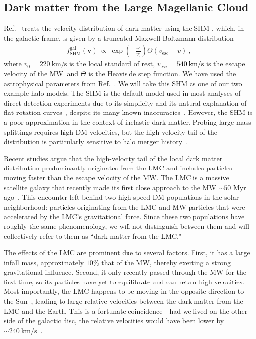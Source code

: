 \documentclass[aps,prd,amsmath,amssymb,10pt,letterpaper,balancelastpage,showpacs,superscriptaddress,nofootinbib,floatfix,notitlepage,longbibliography,twocolumn
]{revtex4-2}
\newcommand{\numcolor}[1]{\textcolor{black}{#1}}
\newcommand{\vbold}{\mathbf{v}}
\newcommand{\vesc}{v_{\text{esc}}}
\newcommand{\kms}{\text{km}/\text{s}}
\begin{document}
\subsection{Dark matter from the Large Magellanic Cloud\label{sec:DM LMC}}
Ref.~\cite{Luminous} treats the velocity distribution of dark matter using the SHM \cite{Original_SHM}, which, in the galactic frame, is given by a truncated Maxwell-Boltzmann distribution
\begin{align}
    f^{\text{gal}}_{\text{SHM}}(\vbold) ~ \propto ~ \exp\left(-\frac{v^2}{v_0^2}\right) \Theta(\vesc - v) ~,
\end{align}
where $v_0=220 ~\kms$ is the local standard of rest, \numcolor{$\vesc=540~\kms$} is the escape velocity of the MW, and $\Theta$ is the Heaviside step function. We have used the astrophysical parameters from Ref.~\cite{LMC}. We will take this SHM as one of our two example halo models. The SHM is the default model used in most analyses of direct detection experiments due to its simplicity and its natural explanation of flat rotation curves~\cite{Lisanti_TASI, SHM++}, despite its many known inaccuracies~\cite{SMH_Deviation_1, SMH_Deviation_2, SMH_Deviation_3, SMH_Deviation_4, SMH_Deviation_5}. However, the SHM is a poor approximation in the context of inelastic dark matter. Probing large mass splittings requires high DM velocities, but the high-velocity tail of the distribution is particularly sensitive to halo merger history~\cite{Lisanti_TASI, SMH_Deviation_4}. 

Recent studies \cite{LMCHighSpeed, LMC, LMC_Similar} argue that the high-velocity tail of the local dark matter distribution predominantly originates from the LMC and includes particles moving faster than the escape velocity of the MW. The LMC is a massive satellite galaxy that recently made its first close approach to the MW $\sim 50$ Myr ago~\cite{FirstInfall}. This encounter left behind two high-speed DM
populations in the solar neighborhood: particles originating from the LMC and MW particles that were accelerated by the LMC’s gravitational force. Since these two populations have roughly the same phenomenology, we will not distinguish between them and will collectively refer to them as ``dark matter from the LMC."

The effects of the LMC are prominent due to several factors. First, it has a large infall mass, approximately $10\%$ that of the MW,  thereby exerting a strong gravitational influence. Second, it only recently passed through the MW for the first time, so its particles have yet to equilibrate and can retain high velocities. Most importantly, the LMC happens to be moving in the opposite direction to the Sun~\cite{LMCHighSpeed}, leading to large relative velocities between the dark matter from the LMC and the Earth. This is a fortunate coincidence---had we lived on the other side of the galactic disc, the relative velocities would have been lower by $\sim 240~\kms$~\cite{LMCHighSpeed}.
\end{document}

